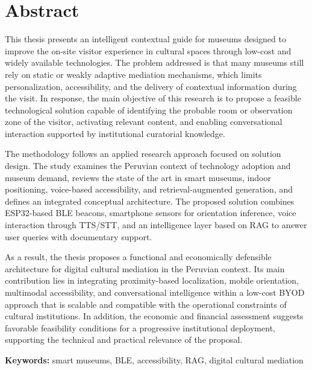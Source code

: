 \chapter*{Abstract}

This thesis presents an intelligent contextual guide for museums designed to improve the on-site visitor experience in cultural spaces through low-cost and widely available technologies. The problem addressed is that many museums still rely on static or weakly adaptive mediation mechanisms, which limits personalization, accessibility, and the delivery of contextual information during the visit. In response, the main objective of this research is to propose a feasible technological solution capable of identifying the probable room or observation zone of the visitor, activating relevant content, and enabling conversational interaction supported by institutional curatorial knowledge.

The methodology follows an applied research approach focused on solution design. The study examines the Peruvian context of technology adoption and museum demand, reviews the state of the art in smart museums, indoor positioning, voice-based accessibility, and retrieval-augmented generation, and defines an integrated conceptual architecture. The proposed solution combines ESP32-based BLE beacons, smartphone sensors for orientation inference, voice interaction through TTS/STT, and an intelligence layer based on RAG to answer user queries with documentary support.

As a result, the thesis proposes a functional and economically defensible architecture for digital cultural mediation in the Peruvian context. Its main contribution lies in integrating proximity-based localization, mobile orientation, multimodal accessibility, and conversational intelligence within a low-cost BYOD approach that is scalable and compatible with the operational constraints of cultural institutions. In addition, the economic and financial assessment suggests favorable feasibility conditions for a progressive institutional deployment, supporting the technical and practical relevance of the proposal.

\noindent\textbf{Keywords:} smart museums, BLE, accessibility, RAG, digital cultural mediation


